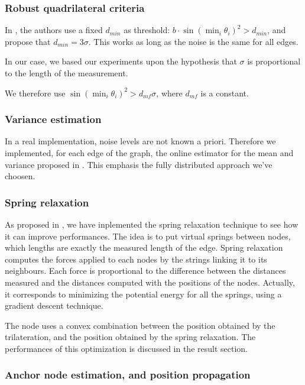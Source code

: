 \documentclass[letterpaper, 10 pt, conference]{ieeeconf}  %
\begin{document}
\subsubsection{Robust quadrilateral criteria}

In \cite{MooreTeller}, the authors use a fixed $d_{min}$ as threshold:  $b \cdot \sin(\min_i \theta_i)^2 > d_{min}$, and propose that $d_{min}=3\sigma$. This works as long as the noise is the same for all edges. 

In our case, we based our experiments upon the hypothesis that $\sigma$ is proportional to the length of the measurement.

We therefore use $\sin(\min_i \theta_i)^2 > d_{mf} \sigma$, where $d_{mf}$ is a constant.

\subsubsection{Variance estimation}

In a real implementation, noise levels are not known a priori. Therefore we implemented, for each edge of the graph, the online estimator for the mean and variance proposed in \cite{Knuth}. This emphasis the fully distributed approach we've choosen.

\subsubsection{Spring relaxation}

As proposed in \cite{MooreTeller}, we have inplemented the spring relaxation technique to see how it can improve performances. The idea is to put virtual springs between nodes, which lengths are exactly the measured length of the edge. Spring relaxation computes the forces applied to each nodes by the strings linking it to its neighbours. Each force is proportional to the difference between the distances measured and the distances computed with the positions of the nodes. Actually, it corresponds to minimizing the potential energy for all the springs, using a gradient descent technique.

The node uses a convex combination between the position obtained by the trilateration, and the position obtained by the spring relaxation. The performances of this optimization is discussed in the result section.

\subsubsection{Anchor node estimation, and position propagation}
\end{document}
